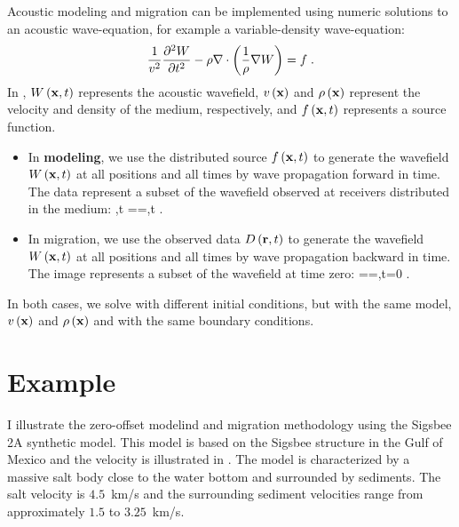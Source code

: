 Acoustic modeling and migration can be implemented using numeric
solutions to an acoustic wave-equation, for example a variable-density
wave-equation:
%
\begin{equation} \label{eqn:AWE}
  \frac{1}{v^2} \frac{\partial^2 W}{\partial t^2} - 
  \rho \nabla \cdot {\left (\frac{1}{\rho} \nabla {W} \right)} = f \;.
\end{equation}
%
In , $W\left ( {\bf x}, t \right)$ represents the acoustic wavefield, $v\left ( {\bf x} \right)$
and $\rho\left ( {\bf x} \right)$ represent the velocity and density of the medium,
respectively, and $f\left ( {\bf x}, t \right)$ represents a source function.
\begin{itemize}
\item In \textbf{modeling}, we use the distributed source $f\left ( {\bf x}, t \right)$ to
  generate the wavefield $W\left ( {\bf x}, t \right)$ at all positions and all times by
  wave propagation forward in time. The data represent a subset of the
  wavefield observed at receivers distributed in the medium: 
  \beq
  \DD\lp \rr,t \rp=\UU\lp \xx=\rr,t \rp \;.
  \eeq
\item In migration, we use the observed data $D\left ( {\bf r},t \right)$ to
  generate the wavefield $W\left ( {\bf x}, t \right)$ at all positions and all times by
  wave propagation backward in time. The image represents a subset of
  the wavefield at time zero: 
  \beq
  \RR\ofx=\UU\lp \xx=,t=0 \rp \;.
  \eeq
\end{itemize}
In both cases, we solve  with different initial conditions,
but with the same model, $v\left ( {\bf x} \right)$ and $\rho\left ( {\bf x} \right)$ and with the same
boundary conditions.


\section{Example}
I illustrate the zero-offset modelind and migration methodology using
the Sigsbee 2A synthetic model. This model is based on the Sigsbee
structure in the Gulf of Mexico and the velocity is illustrated in
. The model is characterized by a massive salt body close to
the water bottom and surrounded by sediments. The salt velocity is
$4.5$~km/s and the surrounding sediment velocities range from
approximately $1.5$ to $3.25$~km/s.


